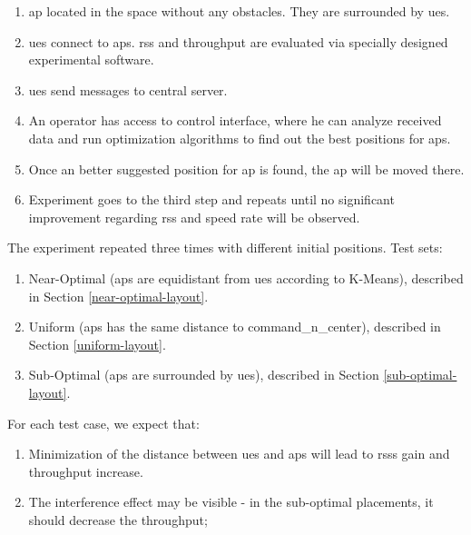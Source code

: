 \begin{enumerate}
\def\labelenumi{\arabic{enumi}.}
\tightlist
\item
  \gls{ap} located in the space without any obstacles. They are surrounded by
  \glspl{ue}.
\item
  \glspl{ue} connect to \glspl{ap}. \acrshort{rss} and throughput are evaluated via specially designed experimental software.
\item
  \Glspl{ue} send messages to central server.
\item
  An operator has access to control interface, where he can analyze received data and run optimization algorithms to find out the best positions for \glspl{ap}.
\item
  Once an better suggested position for \gls{ap} is found, the \gls{ap} will be moved there.
\item
  Experiment goes to the third step and repeats until no significant improvement regarding \acrshort{rss} and speed rate will be observed.
\end{enumerate}

The experiment repeated three times with different initial positions. Test sets:

\begin{enumerate}
\def\labelenumi{\arabic{enumi}.}
\tightlist
\item
Near-Optimal (\glspl{ap} are equidistant from \glspl{ue}  according to K-Means), described in Section \ref{near-optimal-layout}.
\item
Uniform (\glspl{ap} has the same distance to \gls{command_n_center}), described in Section \ref{uniform-layout}.  
\item
Sub-Optimal (\glspl{ap} are surrounded by \glspl{ue}), described in Section \ref{sub-optimal-layout}.


\end{enumerate}

For each test case, we expect that:

\begin{enumerate}
\def\labelenumi{\arabic{enumi}.}
\tightlist
\item
  Minimization of the distance between \glspl{ue} and \glspl{ap} will lead to \glspl{rss} gain and throughput increase.
\item
  The interference effect may be visible - in the sub-optimal
  placements, it should decrease the throughput;
\end{enumerate}
